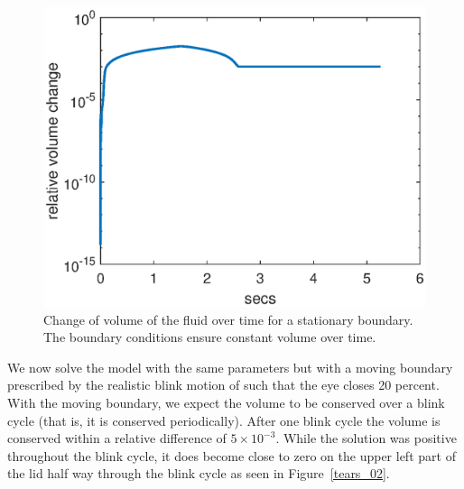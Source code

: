 \begin{figure}
	\centering
	\includegraphics[scale=0.8]{Chapter4/stationary_volume_change}
	\caption{Change of volume of the fluid over time for a stationary boundary. The boundary conditions ensure constant volume over time.}
	\label{eye_volume}
\end{figure}

We now solve the model with the same parameters but with a moving boundary prescribed by the realistic blink motion of \cite{deng2014heat} such that the eye closes 20 percent. With the moving boundary, we expect the volume to be conserved over a blink cycle (that is, it is conserved periodically). After one blink cycle the volume is conserved within a relative difference of $5 \times 10^{-3}$. While the solution was positive throughout the blink cycle, it does become close to zero on the upper left part of the lid half way through the blink cycle as seen in Figure~\ref{tears_02}.

